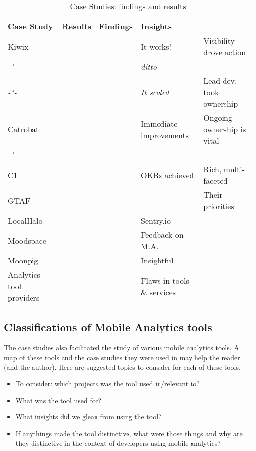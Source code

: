 \begin{table}
    \centering
    \tabcolsep=0.06cm
    \footnotesize
    \begin{tabular}{lllll}\toprule
    Case Study  & Results & Findings    & Insights & \\
    \midrule
    Kiwix                    &     & & It works! & Visibility drove action \\ 
     \textit{-"-}            &     & & \textit{ditto} & \\
     \textit{-"-}            &     & & \textit{It scaled} & Lead dev. took ownership \\
    Catrobat                 &        & & Immediate improvements & Ongoing ownership is vital \\
     \textit{-"-}            &     & & & \\
    C1                       &   & & OKRs achieved & Rich, multi-faceted \\
    GTAF                     &  & & & Their priorities  \\
    LocalHalo                &  & & Sentry.io \\
    Moodspace                &  & & Feedback on M.A. \\
    Moonpig                  &  & & Insightful \\
    Analytics tool providers &  & & Flaws in tools \& services\\
    \bottomrule
    \end{tabular}
    \caption{Case Studies: findings and results}
    \label{tab:empirical-studies-findings-and-results}
\end{table}


\subsection{Classifications of Mobile Analytics tools}
The case studies also facilitated the study of various mobile analytics tools. A map of these tools and the case studies they were used in may help the reader (and the author). Here are suggested topics to consider for each of these tools.
\begin{itemize}
    \itemsep0em
    \item To consider: which projects was the tool used in/relevant to?
    \item What was the tool used for?
    \item What insights did we glean from using the tool?
    \item If anythings made the tool distinctive, what were those things and why are they distinctive in the context of developers using mobile analytics?
\end{itemize}
